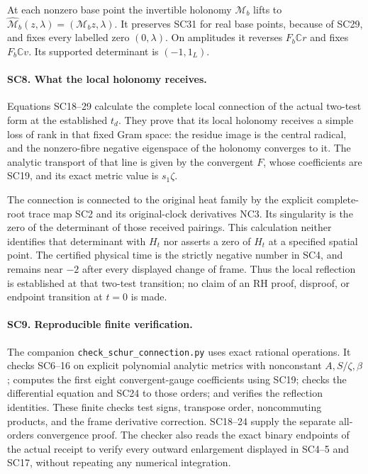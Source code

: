 At each nonzero base point the invertible holonomy
\(\mathcal M_b\) lifts to
\(\widehat{\mathcal M}_b(z,\lambda)=(\mathcal M_bz,\lambda)\).
It preserves SC31 for real base points, because of SC29, and
fixes every labelled zero \((0,\lambda)\). On amplitudes it
reverses \(F_b\mathbb Cr\) and fixes \(F_b\mathbb Cv\).
Its supported determinant is \((-1,1_L)\).

\paragraph{SC8. What the local holonomy receives.}
Equations SC18--29 calculate the complete local connection of
the actual two-test form at the established \(t_d\).
They prove that its local holonomy receives a simple loss of
rank in that fixed Gram space: the residue image is the
central radical, and the nonzero-fibre negative eigenspace of
the holonomy converges to it. The analytic transport of that
line is given by the convergent \(F\), whose coefficients are
SC19, and its exact metric value is \(s_1\zeta\).

The connection is connected to the original heat family by the
explicit complete-root trace map SC2 and its original-clock
derivatives NC3. Its singularity is the zero of the determinant
of those received pairings. This calculation neither
identifies that determinant with \(H_t\) nor asserts a zero of
\(H_t\) at a specified spatial point. The certified physical
time is the strictly negative number in SC4, and remains near
\(-2\) after every displayed change of frame. Thus the local
reflection is established at that two-test transition; no
claim of an RH proof, disproof, or endpoint transition at
\(t=0\) is made.

\paragraph{SC9. Reproducible finite verification.}
The companion \texttt{check\_schur\_connection.py} uses exact
rational operations. It checks SC6--16 on explicit polynomial
analytic metrics with nonconstant \(A,S/\zeta,\beta\); computes
the first eight convergent-gauge coefficients using SC19;
checks the differential equation and SC24 to those orders;
and verifies the reflection identities. These finite checks
test signs, transpose order, noncommuting products, and the
frame derivative correction. SC18--24 supply the separate
all-orders convergence proof. The checker also reads the exact
binary endpoints of the actual receipt to verify every
outward enlargement displayed in SC4--5 and SC17, without
repeating any numerical integration.

